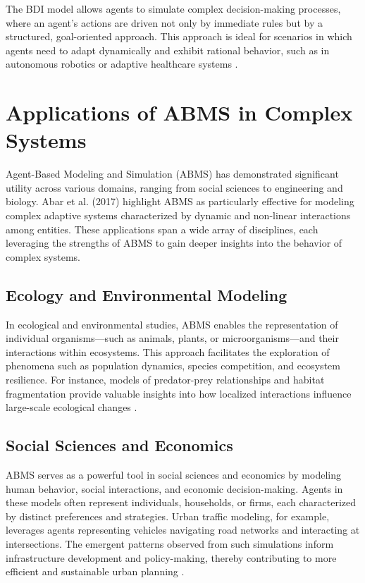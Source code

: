 The BDI model allows agents to simulate complex decision-making processes, where an agent's actions are driven not only by immediate rules but by a structured, goal-oriented approach. This approach is ideal for scenarios in which agents need to adapt dynamically and exhibit rational behavior, such as in autonomous robotics or adaptive healthcare systems \cite{3}.

\section{Applications of ABMS in Complex Systems}

Agent-Based Modeling and Simulation (ABMS) has demonstrated significant utility across various domains, ranging from social sciences to engineering and biology. Abar et al. (2017) highlight ABMS as particularly effective for modeling complex adaptive systems characterized by dynamic and non-linear interactions among entities. These applications span a wide array of disciplines, each leveraging the strengths of ABMS to gain deeper insights into the behavior of complex systems.

\subsection{Ecology and Environmental Modeling} In ecological and environmental studies, ABMS enables the representation of individual organisms—such as animals, plants, or microorganisms—and their interactions within ecosystems. This approach facilitates the exploration of phenomena such as population dynamics, species competition, and ecosystem resilience. For instance, models of predator-prey relationships and habitat fragmentation provide valuable insights into how localized interactions influence large-scale ecological changes \cite{3}.

\subsection{Social Sciences and Economics} ABMS serves as a powerful tool in social sciences and economics by modeling human behavior, social interactions, and economic decision-making. Agents in these models often represent individuals, households, or firms, each characterized by distinct preferences and strategies. Urban traffic modeling, for example, leverages agents representing vehicles navigating road networks and interacting at intersections. The emergent patterns observed from such simulations inform infrastructure development and policy-making, thereby contributing to more efficient and sustainable urban planning \cite{3}.

